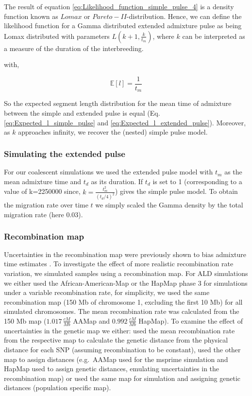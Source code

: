 \documentclass[]{article}
\begin{document}
The result of equation \ref{eq:Likelihood_function_simple_pulse_4} is a density function known as $Lomax$ or $Pareto-II$-distribution. Hence, we can define the likelihood function for a Gamma distributed extended admixture pulse as being Lomax distributed with parameters $L(k+1,\frac{k}{t_{m}})$, where $k$ can be interpreted as a measure of the duration of the interbreeding.

with,

\begin{equation}
\label{eq:Expected_l_extended_pulse}
\mathbb{E}[l] = \frac{1}{t_{m}}
\end{equation}

So the expected segment length distribution for the mean time of admixture between the simple and extended pulse is equal (Eq. \ref{eq:Expected_l_simple_pulse} and  \ref{eq:Expected_l_extended_pulse}). Moreover, as $k$ approaches infinity, we recover the (nested) simple pulse model.

\subsubsection{Simulating the extended pulse}\label{Simulating the expanded pulse}

For our coalescent simulations we used the extended pulse model with $t_m$ as the mean admixture time and $t_d$ as its duration. If $t_d$ is set to 1 (corresponding to a value of k=2250000 since, $k=\frac{t_m^2}{(t_d/4)^2}$) gives the simple pulse model. To obtain the migration rate over time $t$ we simply scaled the Gamma density by the total migration rate (here 0.03). 

\subsubsection{Recombination map}\label{recombination map}

Uncertainties in the recombination map were previously shown to bias
admixture time estimates \citep{sankararaman_date_2012,sankararaman_combined_2016,fu_genome_2014}. To investigate the effect of more realistic
recombination rate variation, we simulated samples using a recombination map. For ALD simulations we
either used the African-American-Map \citep{hinch_landscape_2011} or
the HapMap phase 3 \citep{HapMapConsortium_second_2007} for simulations
under a variable recombination rate, for simplicity, we used the same
recombination map (150 Mb of chromosome 1, excluding the first 10 Mb)
for all simulated chromosomes. The mean recombination rate was
calculated from the 150 Mb map (\(1.017 \, \frac{cM}{Mb}\) AAMap and
\(0.992 \, \frac{cM}{Mb}\) HapMap). To examine the effect of uncertainties in the
genetic map we either: used the mean recombination rate from the
respective map to calculate the genetic distance from the physical
distance for each SNP (assuming recombination to be constant), used the other map to assign distances
(e.g.~AAMap used for the msprime simulation and HapMap used to assign
genetic distances, emulating uncertainties in the recombination map) or used the same map for simulation and assigning
genetic distances (population specific map). 
\end{document}
